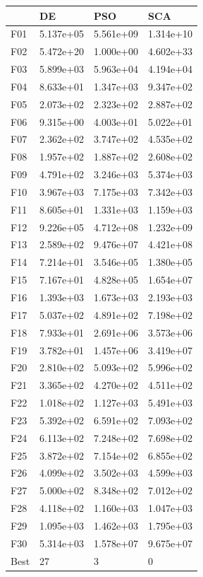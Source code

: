 \begin{tabular}{llll}
\toprule
{} &         DE &        PSO &        SCA \\
\midrule
F01  &  5.137e+05 &  5.561e+09 &  1.314e+10 \\
F02  &  5.472e+20 &  1.000e+00 &  4.602e+33 \\
F03  &  5.899e+03 &  5.963e+04 &  4.194e+04 \\
F04  &  8.633e+01 &  1.347e+03 &  9.347e+02 \\
F05  &  2.073e+02 &  2.323e+02 &  2.887e+02 \\
F06  &  9.315e+00 &  4.003e+01 &  5.022e+01 \\
F07  &  2.362e+02 &  3.747e+02 &  4.535e+02 \\
F08  &  1.957e+02 &  1.887e+02 &  2.608e+02 \\
F09  &  4.791e+02 &  3.246e+03 &  5.374e+03 \\
F10  &  3.967e+03 &  7.175e+03 &  7.342e+03 \\
F11  &  8.605e+01 &  1.331e+03 &  1.159e+03 \\
F12  &  9.226e+05 &  4.712e+08 &  1.232e+09 \\
F13  &  2.589e+02 &  9.476e+07 &  4.421e+08 \\
F14  &  7.214e+01 &  3.546e+05 &  1.380e+05 \\
F15  &  7.167e+01 &  4.828e+05 &  1.654e+07 \\
F16  &  1.393e+03 &  1.673e+03 &  2.193e+03 \\
F17  &  5.037e+02 &  4.891e+02 &  7.198e+02 \\
F18  &  7.933e+01 &  2.691e+06 &  3.573e+06 \\
F19  &  3.782e+01 &  1.457e+06 &  3.419e+07 \\
F20  &  2.810e+02 &  5.093e+02 &  5.996e+02 \\
F21  &  3.365e+02 &  4.270e+02 &  4.511e+02 \\
F22  &  1.018e+02 &  1.127e+03 &  5.491e+03 \\
F23  &  5.392e+02 &  6.591e+02 &  7.093e+02 \\
F24  &  6.113e+02 &  7.248e+02 &  7.698e+02 \\
F25  &  3.872e+02 &  7.154e+02 &  6.855e+02 \\
F26  &  4.099e+02 &  3.502e+03 &  4.599e+03 \\
F27  &  5.000e+02 &  8.348e+02 &  7.012e+02 \\
F28  &  4.118e+02 &  1.160e+03 &  1.047e+03 \\
F29  &  1.095e+03 &  1.462e+03 &  1.795e+03 \\
F30  &  5.314e+03 &  1.578e+07 &  9.675e+07 \\
Best &         27 &          3 &          0 \\
\bottomrule
\end{tabular}
